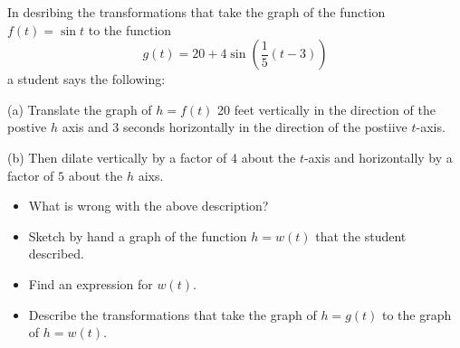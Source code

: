 \documentclass{ximera}
\begin{document}
\begin{example} \label{Ex5:Graphs}
In desribing the transformations that take the graph of the function $f(t) = \sin t$ to the function
\[
  g(t) = 20 + 4 \sin \left( \frac{1}{5}(t-3) \right) 
\]
a student says the following:

(a) Translate the graph of $h=f(t)$ 20 feet vertically in the direction of the postive $h$ axis and $3$ seconds horizontally in the direction of the postiive $t$-axis.

(b) Then dilate vertically by a factor of 4 about the $t$-axis and horizontally by a factor of $5$ about the $h$ aixs.
\end{example}

\begin{itemize}
\item{What is wrong with the above description?}

\item{Sketch by hand a graph of the function $h=w(t)$ that the student described.}

\item{Find an expression for $w(t)$.}

\item{Describe the transformations that take the graph of $h=g(t)$ to the graph of $h=w(t)$.}

\end{itemize}
\end{document}
